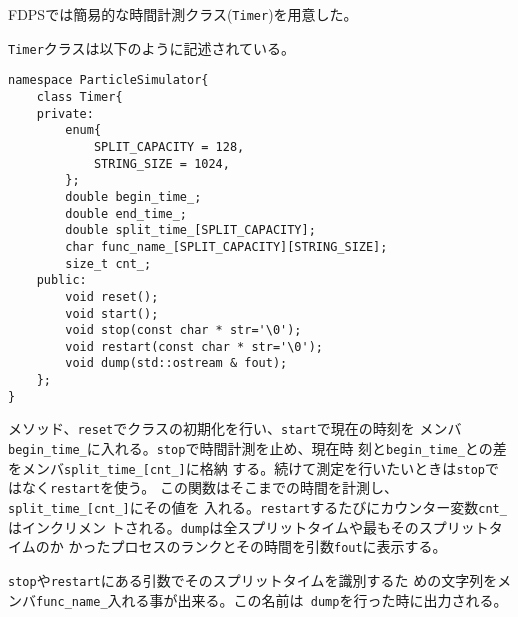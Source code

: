 FDPSでは簡易的な時間計測クラス({\tt Timer})を用意した。

{\tt Timer}クラスは以下のように記述されている。

\begin{lstlisting}[caption=Timer]
namespace ParticleSimulator{
    class Timer{
    private:
        enum{
            SPLIT_CAPACITY = 128,
            STRING_SIZE = 1024,
        };
        double begin_time_;
        double end_time_;
        double split_time_[SPLIT_CAPACITY];
        char func_name_[SPLIT_CAPACITY][STRING_SIZE];
        size_t cnt_;
    public:
        void reset();
        void start();
        void stop(const char * str='\0');
        void restart(const char * str='\0');
        void dump(std::ostream & fout);
    };
}
\end{lstlisting}

メソッド、{\tt reset}でクラスの初期化を行い、{\tt start}で現在の時刻を
メンバ{\tt begin\_time\_}に入れる。{\tt stop}で時間計測を止め、現在時
刻と{\tt begin\_time\_}との差をメンバ{\tt split\_time\_[cnt\_]}に格納
する。続けて測定を行いたいときは{\tt stop}ではなく{\tt restart}を使う。
この関数はそこまでの時間を計測し、{\tt split\_time\_[cnt\_]}にその値を
入れる。{\tt restart}するたびにカウンター変数{\tt cnt\_}はインクリメン
トされる。{\tt dump}は全スプリットタイムや最もそのスプリットタイムのか
かったプロセスのランクとその時間を引数{\tt fout}に表示する。

{\tt stop}や{\tt restart}にある引数でそのスプリットタイムを識別するた
めの文字列をメンバ{\tt func\_name\_}入れる事が出来る。この名前は{\tt
dump}を行った時に出力される。
